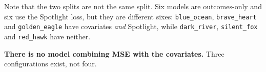 Note that the two splits are not the same split. Six models are outcomes-only and six use the
Spotlight loss, but they are different sixes: \texttt{blue\_ocean}, \texttt{brave\_heart} and
\texttt{golden\_eagle} have covariates \textit{and} Spotlight, while \texttt{dark\_river},
\texttt{silent\_fox} and \texttt{red\_hawk} have neither.

\textbf{There is no model combining MSE with the covariates.} Three configurations exist, not four.
